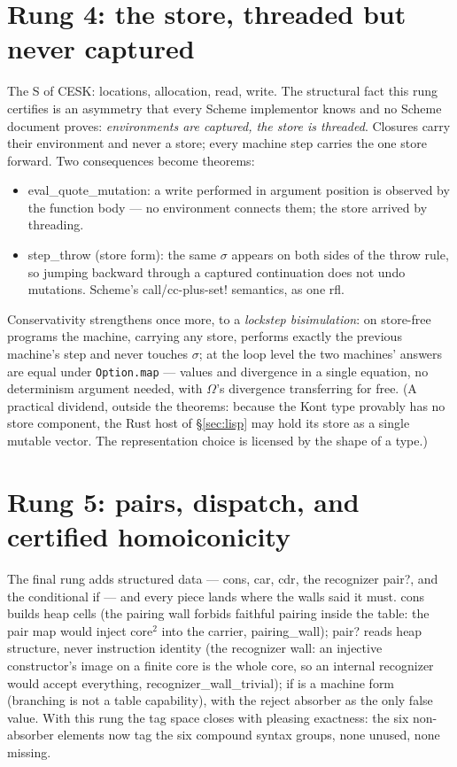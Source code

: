 \documentclass[acmsmall,screen,review]{acmart}
\begin{document}
\section{Rung 4: the store, threaded but never captured}
\label{sec:store}

The S of CESK: locations, allocation, read, write. The structural
fact this rung certifies is an asymmetry that every Scheme
implementor knows and no Scheme document proves: \emph{environments
are captured, the store is threaded}. Closures carry their
environment and never a store; every machine step carries the one
store forward. Two consequences become theorems:

\begin{itemize}
\item \textsf{eval\_quote\_mutation}: a write performed in argument
  position is observed by the function body --- no environment
  connects them; the store arrived by threading.
\item \textsf{step\_throw} (store form): the same $\sigma$ appears on
  both sides of the throw rule, so jumping backward through a
  captured continuation does not undo mutations. Scheme's
  \textsf{call/cc}-plus-\textsf{set!} semantics, as one
  \textsf{rfl}.
\end{itemize}

Conservativity strengthens once more, to a \emph{lockstep
bisimulation}: on store-free programs the machine, carrying any
store, performs exactly the previous machine's step and never
touches $\sigma$; at the loop level the two machines' answers are
equal under \verb|Option.map| --- values and divergence in a single
equation, no determinism argument needed, with $\Omega$'s divergence
transferring for free. (A practical dividend, outside the theorems:
because the \textsf{Kont} type provably has no store component,
the Rust host of \S\ref{sec:lisp} may hold its store as a single
mutable vector. The representation choice is licensed by the shape
of a type.)

\section{Rung 5: pairs, dispatch, and certified homoiconicity}
\label{sec:data}

The final rung adds structured data --- \textsf{cons},
\textsf{car}, \textsf{cdr}, the recognizer \textsf{pair?}, and the
conditional \textsf{if} --- and every piece lands where the walls
said it must. \textsf{cons} builds heap cells (the pairing wall
forbids faithful pairing inside the table: the pair map would inject
$\mathrm{core}^2$ into the carrier, \textsf{pairing\_wall});
\textsf{pair?} reads heap structure, never instruction identity (the
recognizer wall: an injective constructor's image on a finite core is
the whole core, so an internal recognizer would accept everything,
\textsf{recognizer\_wall\_trivial});
\textsf{if} is a machine form (branching is not a table capability),
with the reject absorber as the only false value. With this rung the
tag space closes with pleasing exactness: the six non-absorber
elements now tag the six compound syntax groups, none unused, none
missing.
\end{document}
